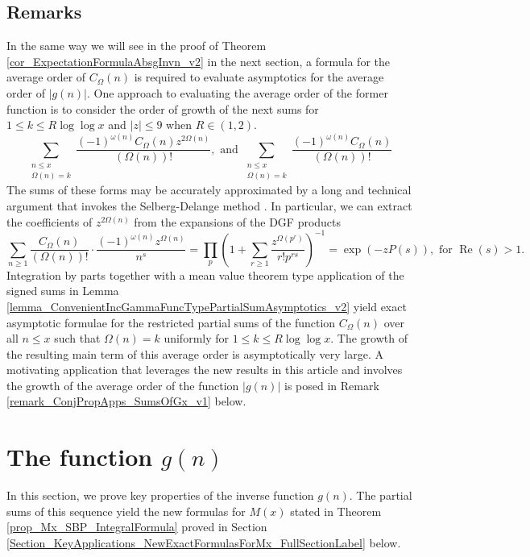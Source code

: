 \documentclass[11pt,reqno,a4letter]{article}
\newcommand{\hlocalref}[1]{\hyperref[#1]{\ref{#1}}}
\numberwithin{equation}{section}
\numberwithin{figure}{section}
\numberwithin{table}{section}
\theoremstyle{plain}
\numberwithin{theorem}{section}
\theoremstyle{definition}
\renewcommand{\Re}{\operatorname{Re}}
\begin{document}
\subsection{Remarks} 

In the same way we will see in the proof of 
Theorem \hlocalref{cor_ExpectationFormulaAbsgInvn_v2} in the next section, 
a formula for the average order of $C_{\Omega}(n)$ is required 
to evaluate asymptotics for the average order of $|g(n)|$. 
One approach to evaluating the average order of the former function 
is to consider the order of growth of the next sums 
for $1 \leq k \leq R \log\log x$ and $|z| \leq 9$ when $R \in (1, 2)$. 
\[
\sum_{\substack{n \leq x \\ \Omega(n)=k}} \frac{(-1)^{\omega(n)} 
     C_{\Omega}(n) z^{2\Omega(n)}}{(\Omega(n))!}, \text{ and } 
     \sum_{\substack{n \leq x \\ \Omega(n)=k}} \frac{(-1)^{\omega(n)} 
     C_{\Omega}(n)}{(\Omega(n))!} 
\]
The sums of these forms may be accurately approximated by a 
long and technical argument that invokes the Selberg-Delange method 
\cite[\S II.6.1]{TENENBAUM-PROBNUMT-METHODS} \cite[\S 7.4]{MV}. 
In particular, we can extract the coefficients of $z^{2\Omega(n)}$ 
from the expansions of the DGF products 
\[
\sum_{n \geq 1} \frac{C_{\Omega}(n)}{(\Omega(n))!} \cdot 
     \frac{(-1)^{\omega(n)} z^{\Omega(n)}}{n^s} = \prod_p \left(1 + \sum_{r \geq 1} 
     \frac{z^{\Omega(p^r)}}{r! p^{rs}}\right)^{-1} 
     = \exp\left(-z P(s)\right), \text{ for } \Re(s) > 1. 
\]
Integration by parts together with a mean value theorem type application of the 
signed sums in Lemma \hlocalref{lemma_ConvenientIncGammaFuncTypePartialSumAsymptotics_v2} 
yield exact asymptotic formulae for the restricted partial sums of 
the function $C_{\Omega}(n)$ over all $n \leq x$ such that $\Omega(n) = k$ 
uniformly for $1 \leq k \leq R \log\log x$. 
The growth of the resulting main term of this 
average order is asymptotically very large.
A motivating application that leverages the new results in this article and involves 
the growth of the average order of the function $|g(n)|$ is posed in 
Remark \hlocalref{remark_ConjPropApps_SumsOfGx_v1} below. 

\section{The function $g(n)$} 
\label{Section_NewFormulasForgInvn_v2} 

In this section, we prove key properties of the inverse function 
$g(n)$. The partial sums of this sequence yield the new formulas for $M(x)$ stated in 
Theorem \hlocalref{prop_Mx_SBP_IntegralFormula} proved in 
Section \hlocalref{Section_KeyApplications_NewExactFormulasForMx_FullSectionLabel} below. 
\end{document}
